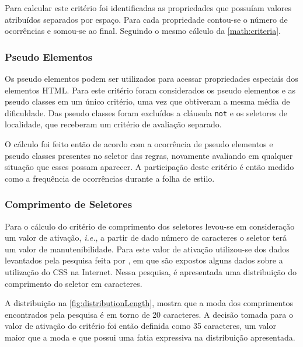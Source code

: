 Para calcular este critério foi identificadas as propriedades que possuíam valores atribuídos separados por espaço. Para cada propriedade contou-se o número de ocorrências e somou-se ao final. Seguindo o mesmo cálculo da \autoref{math:criteria}.

\subsubsection{Pseudo Elementos}
Os pseudo elementos podem ser utilizados para acessar propriedades especiais dos elementos HTML. Para este critério foram considerados os pseudo elementos e as pseudo classes em um único critério, uma vez que obtiveram a mesma média de dificuldade. Das pseudo classes foram excluídos a cláusula \texttt{not} e os seletores de localidade, que receberam um critério de avaliação separado.

O cálculo foi feito então de acordo com a ocorrência de pseudo elementos e pseudo classes presentes no seletor das regras, novamente avaliando em qualquer situação que esses possam aparecer. A participação deste critério é então medido como a frequência de ocorrências durante a folha de estilo.

\subsubsection{Comprimento de Seletores}
Para o cálculo do critério de comprimento dos seletores levou-se em consideração um valor de ativação, \textit{i.e.}, a partir de dado número de caracteres o seletor terá um valor de manutenibilidade. Para este valor de ativação utilizou-se dos dados levantados pela pesquisa feita por , em que são expostos alguns dados sobre a utilização do CSS na Internet. Nessa pesquisa, é apresentada uma distribuição do comprimento do seletor em caracteres. 

A distribuição na \autoref{fig:distributionLength}, mostra que a moda dos comprimentos encontrados pela pesquisa é em torno de 20 caracteres. A decisão tomada para o valor de ativação do critério foi então definida como 35 caracteres, um valor maior que a moda e que possui uma fatia expressiva na distribuição apresentada.


